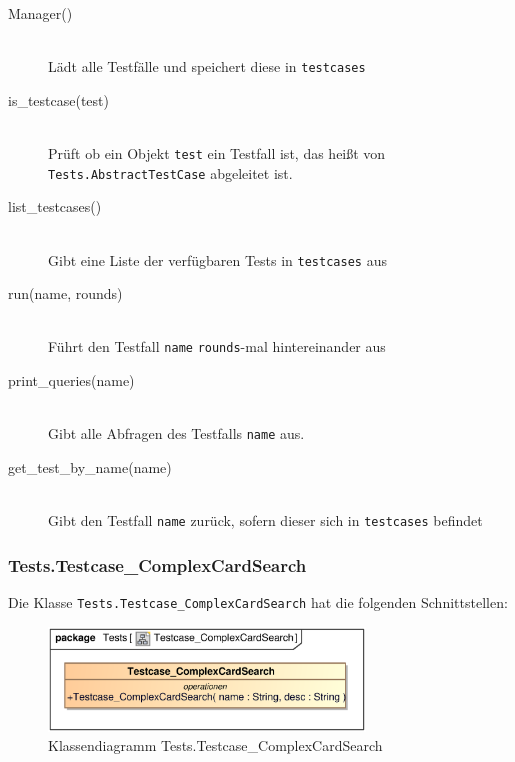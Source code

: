 \begin{description}
    \item[Manager()] \hfill \\
    Lädt alle Testfälle und speichert diese in \verb|testcases|
    
    \item[is\_testcase(test)] \hfill \\
    Prüft ob ein Objekt \verb|test| ein Testfall ist, das heißt von \verb|Tests.AbstractTestCase| abgeleitet ist.
    
    \item[list\_testcases()] \hfill \\
    Gibt eine Liste der verfügbaren Tests in \verb|testcases| aus
    
    \item[run(name, rounds)] \hfill \\
    Führt den Testfall \verb|name| \verb|rounds|-mal hintereinander aus
    
    \item[print\_queries(name)] \hfill \\
    Gibt alle Abfragen des Testfalls \verb|name| aus.
    
    \item[get\_test\_by\_name(name)] \hfill \\
    Gibt den Testfall \verb|name| zurück, sofern dieser sich in \verb|testcases| befindet
\end{description}

\subsubsection{Tests.Testcase\_ComplexCardSearch}
Die Klasse \verb|Tests.Testcase_ComplexCardSearch| hat die folgenden Schnittstellen:

\begin{figure}[H]
    \myfloatalign
    \includegraphics[width=0.75\textwidth]{gfx/MtGDeepAnalysis/Testcase_ComplexCardSearch.eps}
    \caption{Klassendiagramm Tests.Testcase\_ComplexCardSearch}
    \label{fig:class:tests.Testcase_ComplexCardSearch}
\end{figure}

